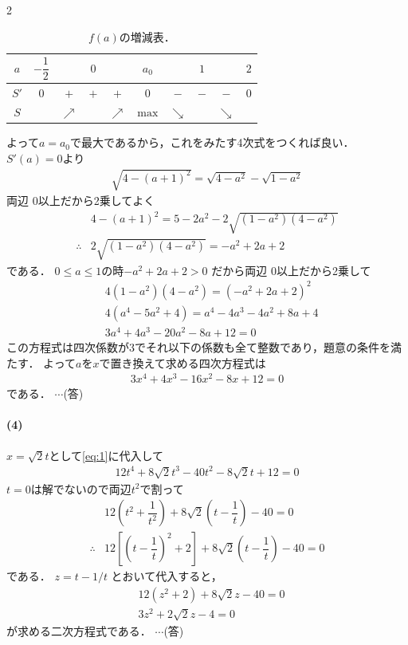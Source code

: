 \documentclass[../../main.tex]{subfiles}
\begin{document}
\begin{multicols}{2}
  \begin{table}[H]
    \centering
    \caption{$f(a)$の増減表．}
    \label{2005-3:table:1}
    \begin{tabular}{|c|c|c|c|c|c|c|c|c|c|}
      \hline
      $a$  & $-\dfrac{1}{2}$ &            & $0$ &            & $a_0$        &            & $1$ &            & $2$ \\
      \hline
      $S'$ & $0$            & $+$        & $+$ & $+$        & $0$          & $-$        & $-$ & $-$        & $0$ \\
      \hline
      $S$  &                & $\nearrow$ &     & $\nearrow$ & $\text{max}$ & $\searrow$ &     & $\searrow$ &     \\
      \hline
    \end{tabular}
  \end{table}

  よって$a=a_0$で最大であるから，これをみたす4次式をつくれば良い．
  $S'(a)=0$より
  \begin{align}
    \sqrt{4-(a+1)^2} = \sqrt{4-a^2} - \sqrt{1-a^2}
  \end{align}
  両辺 $0$以上だから2乗してよく
  \begin{align}
    & 4-(a+1)^2 = 5-2a^2 - 2\sqrt{(1-a^2)(4-a^2)} \\
    \therefore
    & 2\sqrt{(1-a^2)(4-a^2)} = -a^2+2a+2
  \end{align}
  である．
  $0\le a \le 1$の時$-a^2+2a+2>0$ だから両辺 $0$以上だから2乗して
  \begin{align}
    & 4(1-a^2)(4-a^2) = (-a^2+2a+2)^2    \\
    & 4(a^4-5a^2+4) = a^4-4a^3-4a^2+8a+4 \\
    & 3a^4+4a^3-20a^2-8a+12=0
  \end{align}
  この方程式は四次係数が$3$でそれ以下の係数も全て整数であり，題意の条件を満たす．
  よって$a$を$x$で置き換えて求める四次方程式は
  \begin{align}
    3x^4+4x^3-16x^2-8x+12=0 \label{eq:1}
  \end{align}
  である．  $\cdots$(答)

  \paragraph{(4)}
  $x = \sqrt{2}t$として\cref{eq:1}に代入して
  \begin{align}
    12t^4 + 8\sqrt{2}t^3 - 40t^2 - 8\sqrt{2}t + 12 = 0
  \end{align}
  $t=0$は解でないので両辺$t^2$で割って
  \begin{align}
    & 12\left(t^2+\dfrac{1}{t^2}\right) + 8\sqrt{2}\left(t-\dfrac{1}{t}\right) - 40 = 0              \\
    \therefore
    & 12\left[\left(t-\dfrac{1}{t}\right)^2+2\right] + 8\sqrt{2}\left(t-\dfrac{1}{t}\right) - 40 = 0
  \end{align}
  である．
  $ z = t-1/t$ とおいて代入すると，
  \begin{align}
    & 12(z^2+2) + 8\sqrt{2}z - 40 = 0               \\
    & 3z^2 + 2\sqrt{2}z - 4 = 0 \label{eq:2}
  \end{align}
  が求める二次方程式である． $\cdots$(答)


\end{multicols}
\end{document}
